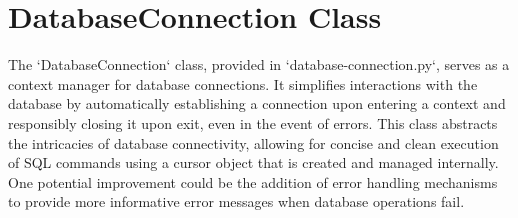 \documentclass{article}
\begin{document}
\section{DatabaseConnection Class}
The `DatabaseConnection` class, provided in `database-connection.py`, serves as a context manager for database connections. It simplifies interactions with the database by automatically establishing a connection upon entering a context and responsibly closing it upon exit, even in the event of errors. This class abstracts the intricacies of database connectivity, allowing for concise and clean execution of SQL commands using a cursor object that is created and managed internally. One potential improvement could be the addition of error handling mechanisms to provide more informative error messages when database operations fail.
\end{document}
